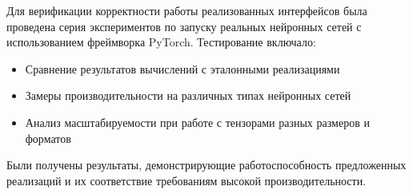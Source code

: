 Для верификации корректности работы реализованных интерфейсов была проведена серия экспериментов по запуску реальных нейронных сетей с использованием фреймворка PyTorch.
Тестирование включало:
\begin{itemize}
    \item Сравнение результатов вычислений с эталонными реализациями
    \item Замеры производительности на различных типах нейронных сетей
    \item Анализ масштабируемости при работе с тензорами разных размеров и форматов
\end{itemize}

Были получены результаты, демонстрирующие работоспособность предложенных реализаций и их соответствие требованиям высокой производительности.